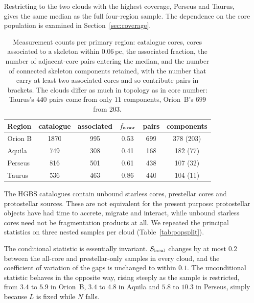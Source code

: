\documentclass[usenatbib,twoside,twocolumn]{mnras}
\begin{document}
Restricting to the two clouds with the highest coverage, Perseus and Taurus, gives the same median as the full four-region sample. The dependence on the core population is examined in Section~\ref{sec:coverage}.



\begin{table}
\caption{Measurement counts per primary region: catalogue cores, cores associated to a skeleton within $0.06$\,pc, the associated fraction, the number of adjacent-core pairs entering the median, and the number of connected skeleton components retained, with the number that carry at least two associated cores and so contribute pairs in brackets. The clouds differ as much in topology as in core number: Taurus's $440$ pairs come from only $11$ components, Orion~B's $699$ from $203$.}
\label{tab:nnpipeline}
\footnotesize
\setlength{\tabcolsep}{5pt}
\begin{tabular}{lccccc}
\toprule
Region & catalogue & associated & $f_{\rm assoc}$ & pairs & components \\
\midrule
Orion B & 1870 & 995 & 0.53 & 699 & 378 (203) \\
Aquila  &  749 & 308 & 0.41 & 168 & 182 (77) \\
Perseus &  816 & 501 & 0.61 & 438 & 107 (32) \\
Taurus  &  536 & 463 & 0.86 & 440 & 104 (11) \\
\bottomrule
\end{tabular}
\end{table}


The HGBS catalogues contain unbound starless cores, prestellar cores and protostellar sources. These are not equivalent for the present purpose: protostellar objects have had time to accrete, migrate and interact, while unbound starless cores need not be fragmentation products at all. We repeated the principal statistics on three nested samples per cloud (Table~\ref{tab:popsplit}).

The conditional statistic is essentially invariant. $S_{\rm local}$ changes by at most $0.2$ between the all-core and prestellar-only samples in every cloud, and the coefficient of variation of the gaps is unchanged to within $0.1$. The unconditional statistic behaves in the opposite way, rising steeply as the sample is restricted, from $3.4$ to $5.9$ in Orion~B, $3.4$ to $4.8$ in Aquila and $5.8$ to $10.3$ in Perseus, simply because $L$ is fixed while $N$ falls.
\end{document}
